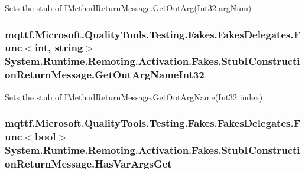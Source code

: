 Sets the stub of I\-Method\-Return\-Message.\-Get\-Out\-Arg(\-Int32 arg\-Num)

\hypertarget{class_system_1_1_runtime_1_1_remoting_1_1_activation_1_1_fakes_1_1_stub_i_construction_return_message_a15a713d36d5a7ee71d4771b44f7f030a}{
\subsubsection[{Get\-Out\-Arg\-Name\-Int32}]{\setlength{\rightskip}{0pt plus 5cm}mqttf.\-Microsoft.\-Quality\-Tools.\-Testing.\-Fakes.\-Fakes\-Delegates.\-Func$<$int, string$>$ System.\-Runtime.\-Remoting.\-Activation.\-Fakes.\-Stub\-I\-Construction\-Return\-Message.\-Get\-Out\-Arg\-Name\-Int32}}\label{class_system_1_1_runtime_1_1_remoting_1_1_activation_1_1_fakes_1_1_stub_i_construction_return_message_a15a713d36d5a7ee71d4771b44f7f030a}


Sets the stub of I\-Method\-Return\-Message.\-Get\-Out\-Arg\-Name(\-Int32 index)

\hypertarget{class_system_1_1_runtime_1_1_remoting_1_1_activation_1_1_fakes_1_1_stub_i_construction_return_message_a501ba7b3705682c10756bf3ea22b233f}{
\subsubsection[{Has\-Var\-Args\-Get}]{\setlength{\rightskip}{0pt plus 5cm}mqttf.\-Microsoft.\-Quality\-Tools.\-Testing.\-Fakes.\-Fakes\-Delegates.\-Func$<$bool$>$ System.\-Runtime.\-Remoting.\-Activation.\-Fakes.\-Stub\-I\-Construction\-Return\-Message.\-Has\-Var\-Args\-Get}}\label{class_system_1_1_runtime_1_1_remoting_1_1_activation_1_1_fakes_1_1_stub_i_construction_return_message_a501ba7b3705682c10756bf3ea22b233f}


